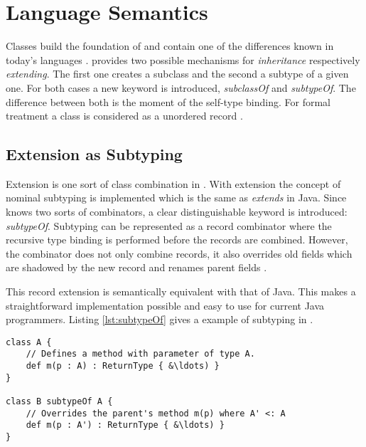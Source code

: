 
\chapter{Language Semantics}
Classes build the foundation of \ooplss and contain one of the
differences known in today's languages
. \ooplss provides two possible
mechanisms for \emph{inheritance} respectively \emph{extending}. The
first one creates a subclass and the second a subtype of a given
one. For both cases a new keyword is introduced, \emph{subclassOf}
and \emph{subtypeOf}. The difference between both is the moment of
the self-type binding. For formal treatment a class is considered as a
unordered record \cite{simons_theory_2002-1}.

\section{Extension as Subtyping}
Extension is one sort of class combination in \ooplss. With extension the concept
of nominal subtyping is implemented which is the same as \emph{extends} in Java.
Since \ooplss knows two sorts of combinators, a clear distinguishable keyword is
introduced: \emph{subtypeOf}. Subtyping can be represented as a record combinator
where the recursive type binding is performed before the records are combined.
However, the combinator does not only combine records, it also overrides old
fields which are shadowed by the new record and renames parent
fields \cite{simons_theory_2003-2}.

This record extension is semantically equivalent with that of Java. This
makes a straightforward implementation possible and easy to use for
current Java programmers. Listing \ref{lst:subtypeOf} gives a example
of subtyping in \ooplss.

\begin{lstlisting}[float,language=ooplss,caption=Subtyping in \ooplss,label=lst:subtypeOf]
class A {
	// Defines a method with parameter of type A.
	def m(p : A) : ReturnType { &\ldots) }
}

class B subtypeOf A {
	// Overrides the parent's method m(p) where A' <: A
	def m(p : A') : ReturnType { &\ldots) }
}
\end{lstlisting}

